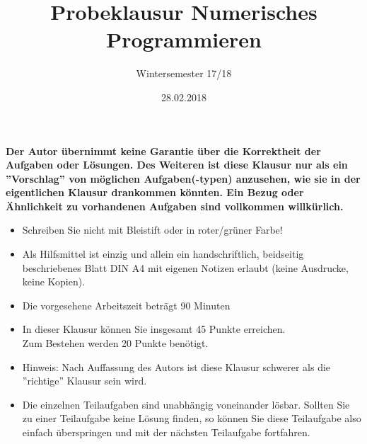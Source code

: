\documentclass{scrartcl}
\begin{document}
\title{Probeklausur Numerisches Programmieren}
\subtitle{Wintersemester 17/18}
\author{\npauthor{}}
\date{28.02.2018}
\maketitle

\textbf{Der Autor übernimmt keine Garantie über die Korrektheit der Aufgaben oder Lösungen. \n Des Weiteren ist diese Klausur nur als ein ''Vorschlag'' von möglichen Aufgaben(-typen) anzusehen, wie sie in der eigentlichen Klausur drankommen könnten. Ein Bezug oder Ähnlichkeit zu vorhandenen Aufgaben sind vollkommen willkürlich.}
\sbreak

\begin{itemize}
	\item Schreiben Sie nicht mit Bleistift oder in roter/grüner Farbe!
	\item Als Hilfsmittel ist einzig und allein ein handschriftlich, beidseitig beschriebenes Blatt DIN A4 mit eigenen Notizen erlaubt (keine Ausdrucke, keine Kopien).
	\item Die vorgesehene Arbeitszeit beträgt 90 Minuten
	\item In dieser Klausur können Sie insgesamt 45 Punkte erreichen. \\Zum Bestehen werden 20 Punkte benötigt.
	\item Hinweis: Nach Auffassung des Autors ist diese Klausur schwerer als die ''richtige'' Klausur sein wird.
	\item Die einzelnen Teilaufgaben sind unabhängig voneinander lösbar.
	Sollten Sie zu einer Teilaufgabe keine Lösung finden, so können Sie diese Teilaufgabe also
	einfach überspringen und mit der nächsten Teilaufgabe fortfahren.
\end{itemize}
\end{document}
